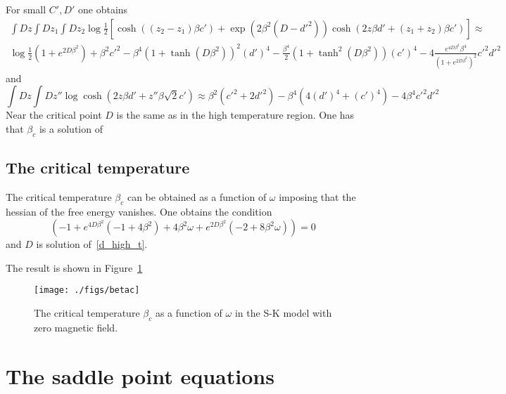 \documentclass[onecolumn,superscriptaddress,pr]{revtex4}
\begin{document}
For small $C',D'$ one obtains 
%
\begin{multline}
\int Dz\int Dz_1\int Dz_2
\log 
\frac{1}{2}\left[\cosh((z_2-z_1)\beta c')+
\exp(2\beta^2(D-d'^2))\cosh(2z\beta d'+(z_1+z_2)
\beta c')\right]\approx\\\log\frac{1}{2}(1+e^{2D\beta^2})+
\beta^2 c'^2-\beta^4(1+\tanh(D\beta^2))^2(d')^4-
\frac{\beta^4}{2}(1+\tanh^2(D\beta^2))(c')^4-
4\frac{e^{4D\beta^2}\beta^4}{(1+e^{2D\beta^2})^2}c'^2d'^2
\end{multline}
%
and
%
\begin{equation}
\int Dz\int Dz''\log\cosh(2z\beta d'+z''\beta
\sqrt{2}c')\approx\beta^2(c'^2+2d'^2)-\beta^4(4(d')^4+(c')^4)-4\beta^4 c'^2d'^2
\end{equation}
%
Near the critical point $D$ is the same as in the high temperature region. One has  
that $\beta_c$ is a solution of
%
\subsection{The critical temperature}

The critical temperature $\beta_c$ can be obtained as a function of 
$\omega$ imposing that the hessian of the free energy vanishes. One 
obtains the condition
%
\begin{equation}
\left(-1+e^{4D\beta^2}(-1+4\beta^2)+4\beta^2\omega +e^{2D\beta^2}(-2+8\beta^2\omega)\right)=0
\end{equation}
%
and $D$ is solution of~\eqref{d_high_t}. 

The result is shown in Figure~\ref{betac}

\begin{figure}[t]
\texttt{[image: ./figs/betac]}
\caption{\label{betac}
 The critical temperature $\beta_c$ as a function of 
 $\omega$ in the S-K model with zero magnetic field. 
}
\end{figure}


\section{The saddle point equations}
\end{document}
